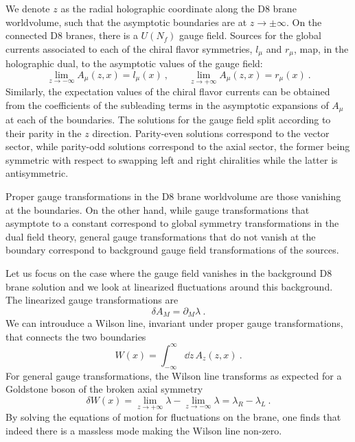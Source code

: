 We denote $z$ as the radial holographic coordinate along the D8 brane worldvolume, such that the asymptotic boundaries are at $z\to \pm\infty$. On the connected D8 branes, there is a $U(N_f)$ gauge field. Sources for the global currents associated to each of the chiral flavor symmetries, $l_\mu$ and $r_\mu$, map, in the holographic dual, to the asymptotic values of the gauge field:
\begin{equation}
	\lim_{z\to-\infty} A_\mu(z,x)=l_\mu(x)
	\ ,\qquad 
	\lim_{z\to+\infty} A_\mu(z,x)=r_\mu(x)\ .
\end{equation}
Similarly, the expectation values of the chiral flavor currents can be obtained from the coefficients of the subleading terms in the asymptotic expansions of $A_\mu$ at each of the boundaries. The solutions for the gauge field split according to their parity in the $z$ direction. Parity-even solutions correspond to the vector sector, while parity-odd solutions correspond to the axial sector, the former being symmetric with respect to swapping left and right chiralities while the latter is antisymmetric. 

Proper gauge transformations in the D8 brane worldvolume are those vanishing at the boundaries. On the other hand, while gauge transformations that asymptote to a constant correspond to global symmetry transformations in the dual field theory, general gauge transformations that do not vanish at the boundary correspond to background gauge field transformations of the sources. 

Let us focus on the case where the gauge field vanishes in the background D8 brane solution and we look at linearized fluctuations around this background. The linearized gauge transformations are
\begin{equation}
	\delta A_M=\partial_M \lambda\ .
\end{equation}
We can introuduce a Wilson line, invariant under proper gauge transformations, that connects the two boundaries 
\begin{equation}
     W(x)=\int_{-\infty}^\infty \dd z\, A_z(z,x)\ .
\end{equation}
For general gauge transformations, the Wilson line transforms as expected for a Goldstone boson of the broken axial symmetry
\begin{equation}
	\delta W(x)=\lim_{z\to +\infty} \lambda-\lim_{z\to-\infty} \lambda=\lambda_R-\lambda_L
	\ .
\end{equation}
By solving the equations of motion for fluctuations on the brane, one finds that indeed there is a massless mode making the Wilson line non-zero.

